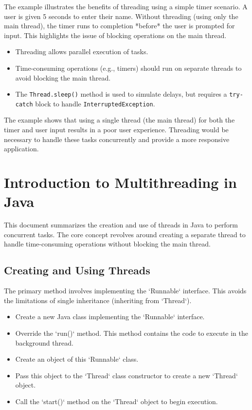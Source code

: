 \documentclass{article}
\begin{document}
\begin{itemize}
The example illustrates the benefits of threading using a simple timer scenario.  A user is given 5 seconds to enter their name.  Without threading (using only the main thread), the timer runs to completion *before* the user is prompted for input.  This highlights the issue of blocking operations on the main thread.

\begin{itemize}
    \item Threading allows parallel execution of tasks.
    \item Time-consuming operations (e.g., timers) should run on separate threads to avoid blocking the main thread.
    \item  The \texttt{Thread.sleep()} method is used to simulate delays, but requires a \texttt{try-catch} block to handle \texttt{InterruptedException}.
\end{itemize}

The example shows that using a single thread (the main thread) for both the timer and user input results in a poor user experience.  Threading would be necessary to handle these tasks concurrently and provide a more responsive application.


\section{Introduction to Multithreading in Java}

This document summarizes the creation and use of threads in Java to perform concurrent tasks.  The core concept revolves around creating a separate thread to handle time-consuming operations without blocking the main thread.

\subsection{Creating and Using Threads}

The primary method involves implementing the `Runnable` interface.  This avoids the limitations of single inheritance (inheriting from `Thread`).

\begin{itemize}
    \item Create a new Java class implementing the `Runnable` interface.
    \item Override the `run()` method. This method contains the code to execute in the background thread.
    \item Create an object of this `Runnable` class.
    \item Pass this object to the `Thread` class constructor to create a new `Thread` object.
    \item Call the `start()` method on the `Thread` object to begin execution.
\end{itemize}


\end{itemize}
\end{document}
